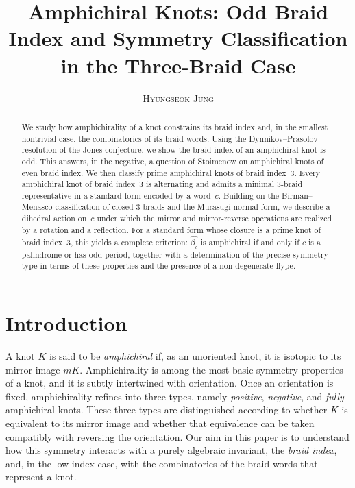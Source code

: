 \documentclass[11pt]{article}
\title{Amphichiral Knots: Odd Braid Index and Symmetry Classification in the Three-Braid Case}
\author{\textsc{Hyungseok Jung}}
\date{}
\theoremstyle{definition}
\begin{document}
\maketitle


\begin{abstract}
We study how amphichirality of a knot constrains its braid index and, in the
smallest nontrivial case, the combinatorics of its braid words. Using the
Dynnikov--Prasolov resolution of the Jones conjecture, we show
the braid index of an amphichiral knot is odd. This answers,
in the negative, a question of Stoimenow on amphichiral knots of even braid
index. We then classify prime amphichiral knots of braid index~$3$. Every
amphichiral knot of braid index~$3$ is alternating and admits a minimal
$3$-braid representative in a standard form encoded by a word~$c$. Building on
the Birman--Menasco classification of closed
$3$-braids and the Murasugi normal form, we describe a dihedral action on~$c$
under which the mirror and mirror-reverse operations are realized by a rotation
and a reflection. For a standard form whose closure is a prime knot
of braid index~$3$, this yields a complete criterion:
$\widehat{\beta_c}$ is amphichiral if and only if $c$ is a palindrome
or has odd period, together with a determination of the precise symmetry
type in terms of these properties and the presence of a non-degenerate flype.
\end{abstract}

\section{Introduction}

A knot $K$ is said to be \emph{amphichiral} if, as an unoriented knot, it is
isotopic to its mirror image $mK$. Amphichirality is among the most basic
symmetry properties of a knot, and it is subtly intertwined with orientation.
Once an orientation is fixed, amphichirality refines into three types, namely
\emph{positive}, \emph{negative}, and \emph{fully} amphichiral knots. These three
types are distinguished according to whether $K$ is equivalent to its mirror
image and whether that equivalence can be taken compatibly with reversing the
orientation. Our aim in this paper is to understand how this symmetry interacts
with a purely algebraic invariant, the \emph{braid index}, and, in the low-index
case, with the combinatorics of the braid words that represent a knot.
\end{document}
